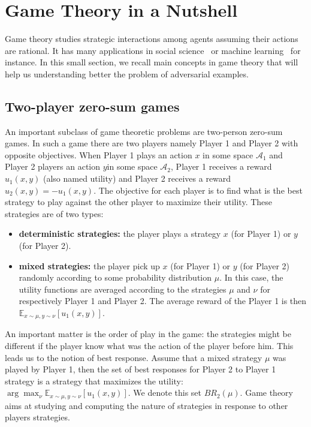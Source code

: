 \section{Game Theory in a Nutshell}

Game theory studies strategic interactions among agents assuming their actions are rational. It has many applications in social science~\citep{xxx} or machine learning~\citep{goodfellow2014generative} for instance. In this small section, we recall main concepts in game theory that will help us understanding better the problem of adversarial examples. 


\subsection{Two-player zero-sum games}

An important subclass of game theoretic problems are two-person zero-sum games.  In such a game there are two players namely Player 1 and Player 2 with opposite objectives. When Player 1 plays an action $x$ in some space $\mathcal{A}_1$ and Player 2 players an action $y$in some space $\mathcal{A}_2$, Player 1 receives a reward $u_1(x,y)$ (also named utility) and Player 2 receives a reward $u_2(x,y)= -u_1(x,y)$. The objective for each player is to find what is the best strategy to play against the other player to maximize their utility. These strategies are of two types:
\begin{itemize}
    \item \textbf{deterministic strategies:} the player plays a strategy $x$ (for Player 1) or $y$ (for Player 2). 
    \item \textbf{mixed strategies:} the player pick up $x$ (for Player 1) or $y$ (for Player 2) randomly according to some probability distribution $\mu$. In this case, the utility functions are averaged according to the strategies $\mu$ and $\nu$ for respectively Player 1 and Player 2.  The average reward of the Player 1 is then $\mathbb{E}_{x\sim\mu,y\sim\nu}\left[u_1(x,y)\right]$.
\end{itemize}

An important matter is the order of play in the game: the strategies might be different if the player know what was the action of the player before him. This leads us to the notion of best response. Assume that a mixed strategy $\mu$ was played by Player 1, then the set of best responses for Player 2 to Player 1 strategy is a strategy that maximizes the utility: $\arg\max_{\nu}\mathbb{E}_{x\sim\mu,y\sim\nu}\left[u_1(x,y)\right]$. We denote this set $BR_2(\mu)$. Game theory aims at studying and computing the nature of strategies in response to other players strategies.

